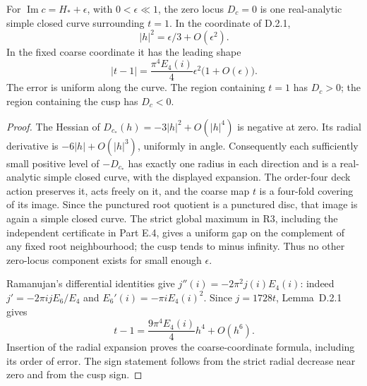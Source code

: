 \begin{proposition}[D.4.1; Proved]
For \(\operatorname{Im}c=H_*+\epsilon\), with
\(0<\epsilon\ll1\), the zero locus \(D_c=0\) is one real-analytic
simple closed curve surrounding \(t=1\). In the coordinate of D.2.1,
\[
 |h|^2=\epsilon/3+O(\epsilon^2).
\]
In the fixed coarse coordinate it has the leading shape
\[
 |t-1|=\frac{\pi^4E_4(i)}4\epsilon^2
                         \bigl(1+O(\epsilon)\bigr).
\]
The error is uniform along the curve. The region containing \(t=1\)
has \(D_c>0\); the region containing the cusp has \(D_c<0\).
\end{proposition}
\begin{proof}
The Hessian of \(D_{c_*}(h)=-3|h|^2+O(|h|^4)\) is negative
at zero. Its radial derivative is \(-6|h|+O(|h|^3)\), uniformly
in angle. Consequently each sufficiently small positive level of
\(-D_{c_*}\) has exactly one radius in each direction and is a
real-analytic simple closed curve, with the displayed expansion.
The order-four deck action preserves it, acts freely on it, and the
coarse map \(t\) is a four-fold covering of its image. Since the
punctured root quotient is a punctured disc, that image is again a
simple closed curve. The strict global maximum in R3, including the
independent certificate in Part E.4, gives a uniform gap on the
complement of any fixed root neighbourhood; the cusp tends to minus
infinity. Thus no other zero-locus component exists for small enough
\(\epsilon\).

Ramanujan's differential identities give
\(j''(i)=-2\pi^2j(i)E_4(i)\): indeed
\(j'=-2\pi i jE_6/E_4\) and
\(E_6'(i)=-\pi iE_4(i)^2\). Since \(j=1728t\), Lemma~D.2.1 gives
\[
 t-1=\frac{9\pi^4E_4(i)}4h^4+O(h^6).
\]
Insertion of the radial expansion proves the coarse-coordinate
formula, including its order of error. The sign statement follows
from the strict radial decrease near zero and from the cusp sign.
\end{proof}


